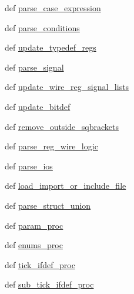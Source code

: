 \begin{DoxyCompactItemize}
def \hyperlink{classsrc_1_1verilog__parser_1_1verilog__parser_ab19b03c5107d2fd791943e2be1406f7c}{parse\-\_\-case\-\_\-expression}
\item 
def \hyperlink{classsrc_1_1verilog__parser_1_1verilog__parser_a8f7f47527e55b31f7ab1df9ec367a4b2}{parse\-\_\-conditions}
\item 
def \hyperlink{classsrc_1_1verilog__parser_1_1verilog__parser_a72fe0b75d740cfef1a00add06ab7e0f3}{update\-\_\-typedef\-\_\-regs}
\item 
def \hyperlink{classsrc_1_1verilog__parser_1_1verilog__parser_a7e91de6d83fd6e012fef8cf42b886a34}{parse\-\_\-signal}
\item 
def \hyperlink{classsrc_1_1verilog__parser_1_1verilog__parser_a6c20c3d036a8846c2d2b398857809799}{update\-\_\-wire\-\_\-reg\-\_\-signal\-\_\-lists}
\item 
def \hyperlink{classsrc_1_1verilog__parser_1_1verilog__parser_aa66877c2836dbc313769721d74b86d78}{update\-\_\-bitdef}
\item 
def \hyperlink{classsrc_1_1verilog__parser_1_1verilog__parser_a4c232a34556813fb83cf4e14170e243e}{remove\-\_\-outside\-\_\-sqbrackets}
\item 
def \hyperlink{classsrc_1_1verilog__parser_1_1verilog__parser_a5061b79dd42f4941f315596484034eb6}{parse\-\_\-reg\-\_\-wire\-\_\-logic}
\item 
def \hyperlink{classsrc_1_1verilog__parser_1_1verilog__parser_afc2edb01505646fb4767d3d3beef78b7}{parse\-\_\-ios}
\item 
def \hyperlink{classsrc_1_1verilog__parser_1_1verilog__parser_a74ba467aaa37c811d43ec9a3d91d6fdf}{load\-\_\-import\-\_\-or\-\_\-include\-\_\-file}
\item 
def \hyperlink{classsrc_1_1verilog__parser_1_1verilog__parser_a1d1e764b68f2b25dcbcb8e8f80c5d297}{parse\-\_\-struct\-\_\-union}
\item 
def \hyperlink{classsrc_1_1verilog__parser_1_1verilog__parser_aedc7d876db9e8de117176e47d47242e4}{param\-\_\-proc}
\item 
def \hyperlink{classsrc_1_1verilog__parser_1_1verilog__parser_a1df1568e05ae1717e28010a4a7019be2}{enums\-\_\-proc}
\item 
def \hyperlink{classsrc_1_1verilog__parser_1_1verilog__parser_a04495de1d32401dd5b7d8b112f171411}{tick\-\_\-ifdef\-\_\-proc}
\item 
def \hyperlink{classsrc_1_1verilog__parser_1_1verilog__parser_a2ac6051f26cee8fc4890f94fa32fa287}{sub\-\_\-tick\-\_\-ifdef\-\_\-proc}
\item 

\end{DoxyCompactItemize}
